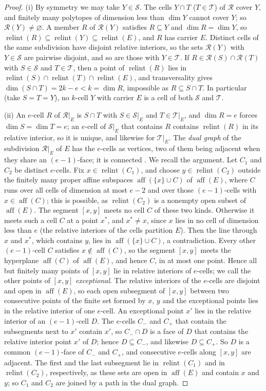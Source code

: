 \documentclass[11pt]{article}
\theoremstyle{definition}
\theoremstyle{remark}
\newcommand{\SSS}{\mathcal S}
\newcommand{\TT}{\mathcal T}
\newcommand{\RR}{\mathcal R}
\newcommand{\relint}{\operatorname{relint}}
\newcommand{\aff}{\operatorname{aff}}
\begin{document}
\begin{proof}
(i) By symmetry we may take $Y\in\SSS$. The cells $Y\cap T$ ($T\in\TT$) of $\RR$ cover $Y$, and finitely many polytopes of
dimension less than $\dim Y$ cannot cover $Y$; so $\RR(Y)\neq\varnothing$. A member $R$ of $\RR(Y)$ satisfies
$R\subseteq Y$ and $\dim R=\dim Y$, so $\relint(R)\subseteq\relint(Y)\subseteq\relint(E)$, and $R$ has
carrier $E$. Distinct cells of
the same subdivision have disjoint relative interiors, so the sets $\RR(Y)$ with $Y\in\SSS$ are pairwise disjoint, and so are those with $Y\in\TT$. If $R\in\RR(S)\cap\RR(T)$ with
$S\in\SSS$ and $T\in\TT$, then a point of $\relint(R)$ lies in
$\relint(S)\cap\relint(T)\cap\relint(E)$, and transversality gives
$\dim(S\cap T)=2k-e<k=\dim R$, impossible as $R\subseteq S\cap T$. In particular (take $S=T=Y$), no $k$-cell
$Y$ with carrier $E$ is a cell of both $\SSS$ and $\TT$.

(ii) An $e$-cell $R$ of $\RR|_E$ is $S\cap T$ with $S\in\SSS|_E$ and $T\in\TT|_E$, and $\dim R=e$ forces
$\dim S=\dim T=e$; an $e$-cell of $\SSS|_E$ that contains $R$ contains $\relint(R)$ in its relative interior,
so it is unique, and likewise for $\TT|_E$. The \emph{dual graph} of the subdivision $\RR|_E$ of $E$ has the $e$-cells as vertices, two of them being adjacent when they share an $(e-1)$-face; it is connected \cite[Lemma~2]{CJK}. We recall the argument. Let $C_1$ and $C_2$ be distinct $e$-cells. Fix $x\in\relint(C_1)$, and choose $y\in\relint(C_2)$ outside the finitely many proper affine subspaces $\aff(\{x\}\cup C)$ of
$\aff(E)$, where $C$ runs over all cells of dimension at most $e-2$ and over those $(e-1)$-cells with $x\in\aff(C)$; this is possible, as $\relint(C_2)$ is a nonempty open subset of $\aff(E)$. The segment $[x,y]$ meets no cell $C$ of these two kinds. Otherwise it meets such a cell $C$ at a point $x^*$, and $x^*\neq x$, since $x$ lies in no cell of dimension less than $e$ (the relative interiors of the cells partition $E$). Then the line through $x$ and $x^*$, which contains $y$, lies in $\aff(\{x\}\cup C)$, a contradiction. Every other $(e-1)$-cell $C$ satisfies $x\notin\aff(C)$, so the segment $[x,y]$ meets the hyperplane $\aff(C)$ of $\aff(E)$, and hence $C$, in at most one point. Hence all but finitely many points of $[x,y]$ lie in relative
interiors of $e$-cells; we call the other points of $[x,y]$ \emph{exceptional}. The relative interiors of the
$e$-cells are disjoint and open in $\aff(E)$, so each open subsegment of $[x,y]$ between two consecutive points of the finite set formed by $x$, $y$ and the exceptional points lies in the relative interior of one $e$-cell. An exceptional point $x'$
lies in the relative interior of an $(e-1)$-cell $D$. The $e$-cells $C_-$ and $C_+$ that contain the subsegments next to $x'$ contain $x'$, so $C_-\cap D$ is a face of $D$ that contains the relative interior point $x'$ of $D$; hence $D\subseteq C_-$, and likewise $D\subseteq C_+$. So $D$ is a common $(e-1)$-face of $C_-$ and $C_+$,
and consecutive $e$-cells along $[x,y]$ are adjacent. The first and the last subsegment lie in $\relint(C_1)$ and in $\relint(C_2)$, respectively, as these sets are open in $\aff(E)$ and contain $x$ and $y$; so $C_1$ and $C_2$ are joined by a path in the dual graph.


\end{proof}
\end{document}

